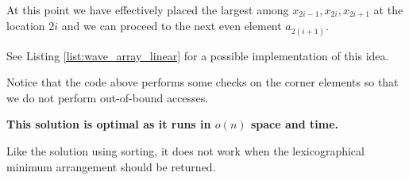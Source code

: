 At this point we have effectively placed the largest among $x_{2i-1},x_{2i},x_{2i+1}$ at the location $2i$ and we can proceed to the next even element $a_{2(i+1)}$. 

See Listing \ref{list:wave_array_linear} for a possible implementation of this idea.



Notice that the code above performs some checks on the corner elements so that we do not perform out-of-bound accesses.

\textbf{This solution is optimal as it runs in $o(n)$ space and time.} 

Like the solution using sorting, it does not work when the lexicographical minimum arrangement should be returned.


